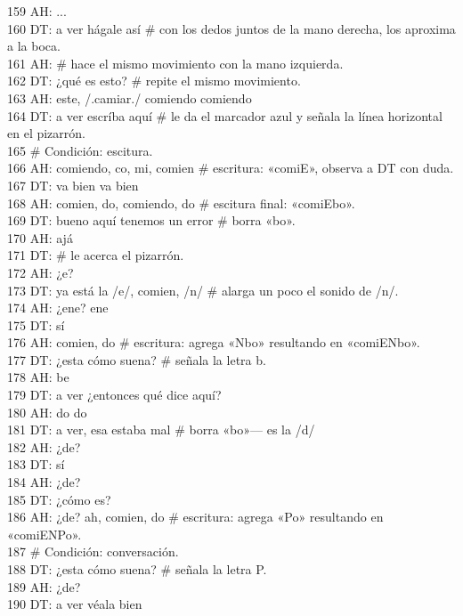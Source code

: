 159 AH: ...\\
160 DT: a ver hágale así \# con los dedos juntos de la mano derecha, los aproxima a la boca.\\
161 AH: \# hace el mismo movimiento con la mano izquierda.\\
162 DT: ¿qué es esto? \# repite el mismo movimiento.\\
163 AH: este, /.camiar./ comiendo comiendo\\
164 DT: a ver escríba aquí \# le da el marcador azul y señala la línea horizontal en el pizarrón.\\
165 \# Condición: escitura.\\
166 AH: comiendo, co, mi, comien \# escritura: «comiE», observa a DT con duda.\\
167 DT: va bien va bien\\
168 AH: comien, do, comiendo, do \# escitura final: «comiEbo».\\
169 DT: bueno aquí tenemos un error \# borra «bo».\\
170 AH: ajá\\
171 DT: \# le acerca el pizarrón.\\
172 AH: ¿e?\\
173 DT: ya está la /e/, comien, /n/ \# alarga un poco el sonido de /n/.\\
174 AH: ¿ene? ene\\
175 DT: sí\\
176 AH: comien, do \# escritura: agrega «Nbo» resultando en «comiENbo».\\
177 DT: ¿esta cómo suena? \# señala la letra b.\\
178 AH: be\\
179 DT: a ver ¿entonces qué dice aquí?\\
180 AH: do do\\
181 DT: a ver, esa estaba mal \# borra «bo»--- es la /d/\\
182 AH: ¿de?\\
183 DT: sí\\
184 AH: ¿de?\\
185 DT: ¿cómo es?\\
186 AH: ¿de? ah, comien, do \# escritura: agrega «Po» resultando en «comiENPo».\\
187 \# Condición: conversación.\\
188 DT: ¿esta cómo suena? \# señala la letra P.\\
189 AH: ¿de?\\
190 DT: a ver véala bien\\

